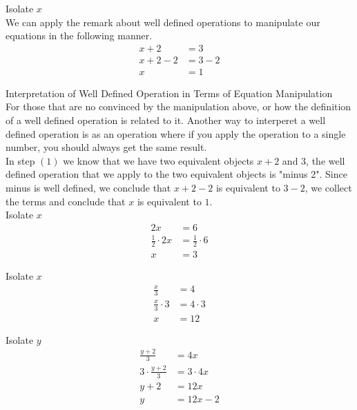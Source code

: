 \documentclass{book}
\begin{document}
  {\example Isolate $x$ \\
     We can apply the remark about well defined operations to manipulate our equations in the following manner.
    \begin{align}
      x + 2 & = 3\\
      x + 2 - 2 & = 3 - 2\\
      x & = 1
    \end{align}
  }

  {\remark Interpretation of Well Defined Operation in Terms of Equation Manipulation \\
    For those that are no convinced by the manipulation above, or how the definition of a well defined operation is related to it. Another way to interperet a well defined operation is as an operation where if you apply the operation to a single number, you should always get the same result.\\

     In step $(1)$ we know that we have two equivalent objects $x + 2$ and $3$, the well defined operation that we apply to the two equivalent objects is "minus 2". Since minus is well defined, we conclude that $x + 2 - 2$ is equivalent to $3 - 2$, we collect the terms and conclude that $x$ is equivalent to $1$.
  }\\

  {\example Isolate $x$ \\
    \begin{align*}
      2x & = 6\\
      \frac{1}{2} \cdot 2x & = \frac{1}{2} \cdot 6\\
      x & = 3
    \end{align*}
  }

  {\example Isolate $x$ \\
    \begin{align*}
      \frac{x}{3} & = 4\\
      \frac{x}{3} \cdot 3 & = 4 \cdot 3\\
      x & = 12
    \end{align*}
  }

  {\example Isolate $y$ \\
    \begin{align*}
      \frac{y + 2}{3} & = 4x\\
      3 \cdot \frac{y + 2}{3} & = 3 \cdot 4x\\
      y + 2 & = 12x\\
      y & = 12x - 2
    \end{align*}
  }
\end{document}
